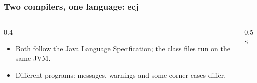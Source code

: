 \documentclass[aspectratio=169,10pt,compress]{beamer}
\begin{document}
\begin{frame}[t,fragile] \frametitle{Two compilers, one language: ecj}
  \begin{columns}[T]
    \begin{column}{0.4\textwidth}
      \begin{itemize}\small
        \item Both follow the Java Language Specification; the class files run on the same JVM.
        \item Different programs: messages, warnings and some corner cases differ.
      \end{itemize}
    \end{column}
    \begin{column}{0.58\textwidth}
    \end{column}
  \end{columns}
\end{frame}

\end{document}
